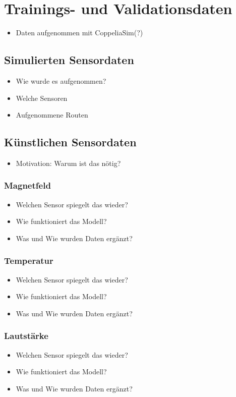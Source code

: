 \chapter{Trainings- und Validationsdaten}
\begin{itemize}
    \item Daten aufgenommen mit CoppeliaSim(?)
\end{itemize}

\section{Simulierten Sensordaten}
\begin{itemize}
    \item Wie wurde es aufgenommen?
    \item Welche Sensoren
    \item Aufgenommene Routen
\end{itemize}

\section{Künstlichen Sensordaten}
\begin{itemize}
    \item Motivation: Warum ist das nötig?
\end{itemize}

\subsection{Magnetfeld}
\begin{itemize}
    \item Welchen Sensor spiegelt das wieder?
    \item Wie funktioniert das Modell?
    \item Was und Wie wurden Daten ergänzt?
\end{itemize}

\subsection{Temperatur}
\begin{itemize}
    \item Welchen Sensor spiegelt das wieder?
    \item Wie funktioniert das Modell?
    \item Was und Wie wurden Daten ergänzt?
\end{itemize}

\subsection{Lautstärke}
\begin{itemize}
    \item Welchen Sensor spiegelt das wieder?
    \item Wie funktioniert das Modell?
    \item Was und Wie wurden Daten ergänzt?
\end{itemize}

